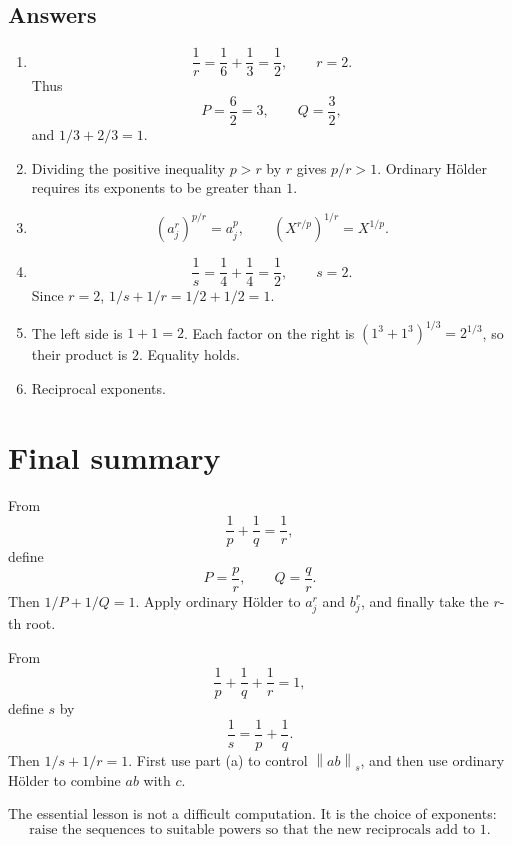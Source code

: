 \documentclass[11pt]{article}
\newcommand{\norm}[1]{\left\lVert #1\right\rVert}
\begin{document}
\subsection*{Answers}

\begin{enumerate}
  \item
  \[
    \frac1r=\frac16+\frac13=\frac12,
    \qquad r=2.
  \]
  Thus
  \[
    P=\frac62=3,
    \qquad
    Q=\frac32,
  \]
  and \(1/3+2/3=1\).

  \item Dividing the positive inequality \(p>r\) by \(r\) gives \(p/r>1\). Ordinary H\"older requires its exponents to be greater than \(1\).

  \item
  \[
    (a_j^r)^{p/r}=a_j^p,
    \qquad
    (X^{r/p})^{1/r}=X^{1/p}.
  \]

  \item
  \[
    \frac1s=\frac14+\frac14=\frac12,
    \qquad s=2.
  \]
  Since \(r=2\), \(1/s+1/r=1/2+1/2=1\).

  \item The left side is \(1+1=2\). Each factor on the right is \((1^3+1^3)^{1/3}=2^{1/3}\), so their product is \(2\). Equality holds.

  \item Reciprocal exponents.
\end{enumerate}

\section{Final summary}

\begin{ideaBox}[Part (a)]
From
\[
  \frac1p+\frac1q=\frac1r,
\]
define
\[
  P=\frac{p}{r},
  \qquad Q=\frac{q}{r}.
\]
Then \(1/P+1/Q=1\). Apply ordinary H\"older to \(a_j^r\) and \(b_j^r\), and finally take the \(r\)-th root.
\end{ideaBox}

\begin{ideaBox}[Part (b)]
From
\[
  \frac1p+\frac1q+\frac1r=1,
\]
define \(s\) by
\[
  \frac1s=\frac1p+\frac1q.
\]
Then \(1/s+1/r=1\). First use part (a) to control \(\norm{ab}_s\), and then use ordinary H\"older to combine \(ab\) with \(c\).
\end{ideaBox}

The essential lesson is not a difficult computation. It is the choice of exponents:
\[
  \boxed{
  \text{raise the sequences to suitable powers so that the new reciprocals add to }1.}
\]
\end{document}

